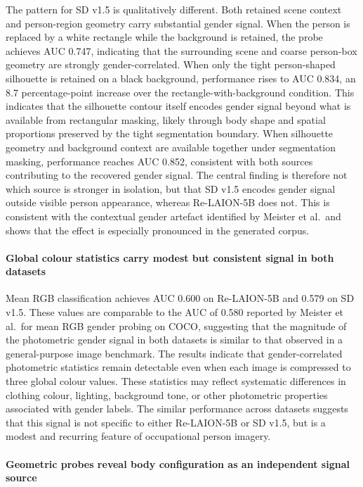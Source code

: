 The pattern for SD v1.5 is qualitatively different. Both retained scene context and person-region geometry carry substantial gender signal. When the person is replaced by a white rectangle while the background is retained, the probe achieves AUC 0.747, indicating that the surrounding scene and coarse person-box geometry are strongly gender-correlated. When only the tight person-shaped silhouette is retained on a black background, performance rises to AUC 0.834, an 8.7 percentage-point increase over the rectangle-with-background condition. This indicates that the silhouette contour itself encodes gender signal beyond what is available from rectangular masking, likely through body shape and spatial proportions preserved by the tight segmentation boundary. When silhouette geometry and background context are available together under segmentation masking, performance reaches AUC 0.852, consistent with both sources contributing to the recovered gender signal. The central finding is therefore not which source is stronger in isolation, but that SD v1.5 encodes gender signal outside visible person appearance, whereas Re-LAION-5B does not. This is consistent with the contextual gender artefact identified by Meister et al.\ and shows that the effect is especially pronounced in the generated corpus.

\paragraph{Global colour statistics carry modest but consistent signal in both datasets}

Mean RGB classification achieves AUC 0.600 on Re-LAION-5B and 0.579 on SD v1.5. These values are comparable to the AUC of 0.580 reported by Meister et al.\ for mean RGB gender probing on COCO, suggesting that the magnitude of the photometric gender signal in both datasets is similar to that observed in a general-purpose image benchmark. The results indicate that gender-correlated photometric statistics remain detectable even when each image is compressed to three global colour values. These statistics may reflect systematic differences in clothing colour, lighting, background tone, or other photometric properties associated with gender labels. The similar performance across datasets suggests that this signal is not specific to either Re-LAION-5B or SD v1.5, but is a modest and recurring feature of occupational person imagery.

\paragraph{Geometric probes reveal body configuration as an independent signal source}

